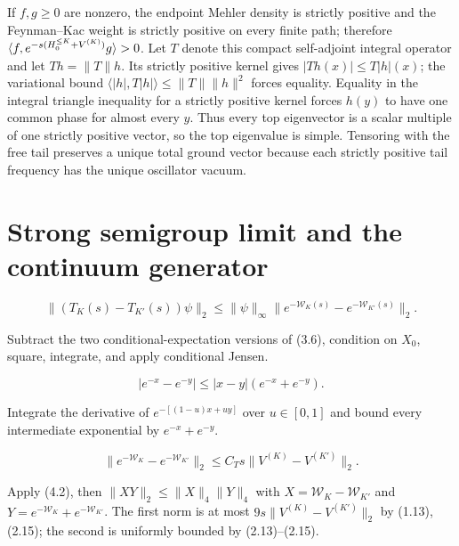 \documentclass[11pt,a4paper]{article}
\begin{document}
\Because If $f,g\ge0$ are nonzero, the endpoint Mehler density is strictly
positive and the Feynman--Kac weight is strictly positive on every finite path;
therefore $\langle f,e^{-s(H_0^{\le K}+V^{(K)})}g\rangle>0$.  Let $T$ denote this compact
self-adjoint integral operator and let $Th=\|T\|h$.  Its strictly positive kernel
gives $|Th(x)|\le T|h|(x)$; the variational bound
$\langle |h|,T|h|\rangle\le\|T\|\|h\|^2$ forces equality.  Equality in the
integral triangle inequality for a strictly positive kernel forces $h(y)$ to have
one common phase for almost every $y$.  Thus every top eigenvector is a scalar
multiple of one strictly positive vector, so the top eigenvalue is simple.
Tensoring with the free tail preserves a unique total ground vector because each
strictly positive tail frequency has the unique oscillator vacuum.

\QedStep

\section{Strong semigroup limit and the continuum generator}


\[
 \|(T_K(s)-T_{K'}(s))\psi\|_2
 \le\|\psi\|_\infty
 \|e^{-\mathcal W_K(s)}-e^{-\mathcal W_{K'}(s)}\|_2.
\tag{4.1}
\]

\Because Subtract the two conditional-expectation versions of (3.6), condition on
$X_0$, square, integrate, and apply conditional Jensen.

\[
 |e^{-x}-e^{-y}|\le|x-y|(e^{-x}+e^{-y}).\tag{4.2}
\]

\Because Integrate the derivative of $e^{-[(1-u)x+uy]}$ over $u\in[0,1]$ and
bound every intermediate exponential by $e^{-x}+e^{-y}$.

\[
 \|e^{-\mathcal W_K}-e^{-\mathcal W_{K'}}\|_2
 \le C_Ts\|V^{(K)}-V^{(K')}\|_2.
\tag{4.3}
\]

\Because Apply (4.2), then
$\|XY\|_2\le\|X\|_4\|Y\|_4$ with
$X=\mathcal W_K-\mathcal W_{K'}$ and
$Y=e^{-\mathcal W_K}+e^{-\mathcal W_{K'}}$.  The first norm is at most
$9s\|V^{(K)}-V^{(K')}\|_2$ by (1.13), (2.15); the second is uniformly
bounded by (2.13)--(2.15).
\end{document}
